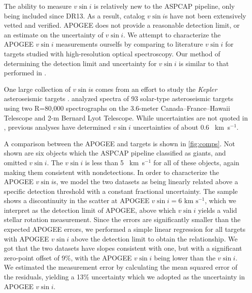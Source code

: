 \documentclass[manuscript]{aastex6}
\newcommand{\vsini}{\ensuremath{v \sin i}}
\newcommand{\Kepler}{\mbox{\textit{Kepler}}}
\newcommand{\kms}{\textrm{~km~s}\ensuremath{^{-1}}}
\begin{document}
The ability to measure \vsini{} is relatively new to the ASPCAP pipeline, only
being included since DR13. As a result, catalog \vsini{}s have not been 
extensively vetted and verified. APOGEE does not provide a reasonable
detection limit, or an estimate on the uncertainty of \vsini{}. We
attempt to characterize the APOGEE \vsini{} measurements ourselfs
by comparing to literature \vsini{} for targets studied with high-resolution 
optical spectroscopy. Our method of determining the detection limit and
uncertainty for \vsini{} is similar to that performed in
\citet{Tayar15}.

One large collection of \vsini{}s comes from an effort to study the
\Kepler{} asteroseismic targets \citep{Bruntt12}. \citet{Bruntt12} analyzed 
spectra of 93 solar-type asteroseismic targets using two R=80,000 spectrographs 
on the 3.6-meter Canada--France--Hawaii Telescope and 2-m Bernard Lyot
Telescope. While uncertainties are not quoted in \citet{Bruntt12},
previous analyses have determined \vsini{} uncertainties of about 0.6
\kms \citep{Bruntt10a,Bruntt10b}.

A comparison between the APOGEE and \citet{Bruntt12} targets is shown in
\cref{fig:comps}. Not shown are six
objects which the ASPCAP pipeline classified as giants, and omitted
\vsini{}. The \citet{Bruntt12} \vsini{} is less than 5
\kms{} for all of these objects, again making them consistent with 
nondetections.  In order to characterize the APOGEE \vsini{}s, we model the 
two datasets as being linearly related above a specific detection threshold 
with a constant fractional uncertainty. The sample shows a 
discontinuity in the scatter at APOGEE \(\vsini=6\kms\), which we 
interpret as the detection limit of APOGEE, above which \vsini{} yields a 
valid stellar rotation measurement. Since the \citet{Bruntt12} errors are
significantly smaller than the expected APOGEE errors, we performed a simple 
linear regression for all targets with APOGEE \vsini{} above the detection 
limit to obtain the relationship. We got that the two datasets have slopes
consistent with one, but with a significant zero-point offset of 9\%,
with the APOGEE \vsini{} being lower than the \citet{Bruntt12}
\vsini{}. We estimated the measurement error by calculating the mean squared 
error of the residuals, yielding a 13\% uncertainty which we adopted as the 
uncertainty in APOGEE \vsini{}.
\end{document}
